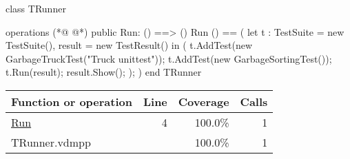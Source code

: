 \begin{vdmpp}[breaklines=true]
class TRunner

operations
(*@
\label{Run:4}
@*)
public Run: () ==> ()
Run () == 
( 
    let t : TestSuite = new TestSuite(), result = new TestResult()
    in
    (
    t.AddTest(new GarbageTruckTest("Truck unittest"));
    t.AddTest(new GarbageSortingTest());
    t.Run(result);
    result.Show();
    );
)
end TRunner
\end{vdmpp}
\bigskip
\begin{longtable}{|l|r|r|r|}
\hline
Function or operation & Line & Coverage & Calls \\
\hline
\hline
\hyperref[Run:4]{Run} & 4&100.0\% & 1 \\
\hline
\hline
TRunner.vdmpp & & 100.0\% & 1 \\
\hline
\end{longtable}

